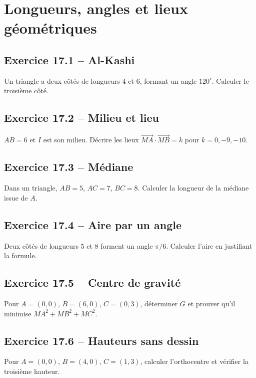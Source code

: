 \chapter{Longueurs, angles et lieux géométriques}
\section*{Exercice 17.1 -- Al-Kashi}
Un triangle a deux côtés de longueurs $4$ et $6$, formant un angle $120^\circ$. Calculer le troisième côté.

\section*{Exercice 17.2 -- Milieu et lieu}
$AB=6$ et $I$ est son milieu. Décrire les lieux $\overrightarrow{MA}\cdot\overrightarrow{MB}=k$ pour $k=0,-9,-10$.

\section*{Exercice 17.3 -- Médiane}
Dans un triangle, $AB=5$, $AC=7$, $BC=8$. Calculer la longueur de la médiane issue de $A$.

\section*{Exercice 17.4 -- Aire par un angle}
Deux côtés de longueurs $5$ et $8$ forment un angle $\pi/6$. Calculer l'aire en justifiant la formule.

\section*{Exercice 17.5 -- Centre de gravité}
Pour $A=(0,0)$, $B=(6,0)$, $C=(0,3)$, déterminer $G$ et prouver qu'il minimise $MA^2+MB^2+MC^2$.

\section*{Exercice 17.6 -- Hauteurs sans dessin}
Pour $A=(0,0)$, $B=(4,0)$, $C=(1,3)$, calculer l'orthocentre et vérifier la troisième hauteur.
